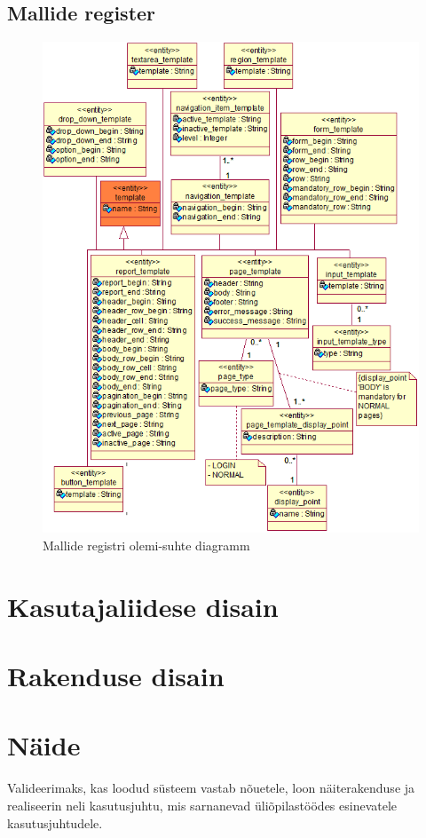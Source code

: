 \documentclass[a4paper,12pt]{article} %
\begin{document}
\subsection{Mallide register}
\begin{figure}[H]
\begin{center}
\includegraphics[bb=0 0 601 784,scale=1]{./diagrams/template-er-diagram.png}
\caption{Mallide registri olemi-suhte diagramm}
\label{fig_mallide_registri_olemi_suhte_diagramm}
\end{center}
\end{figure}

\section{Kasutajaliidese disain}
\section{Rakenduse disain}
\section{Näide}
Valideerimaks, kas loodud süsteem vastab nõuetele, loon näiterakenduse ja realiseerin neli kasutusjuhtu, mis sarnanevad üliõpilastöödes esinevatele kasutusjuhtudele.
\end{document}
